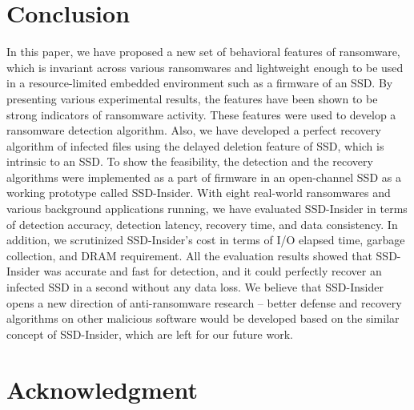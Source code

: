 \documentclass[conference]{IEEEtran}
\newcommand{\ours}{SSD-Insider}
\begin{document}
\section{Conclusion}
In this paper, we have proposed a new set of behavioral features of
ransomware, which is invariant across various ransomwares and
lightweight enough to be used in a resource-limited embedded
environment such as a firmware of an SSD.  By presenting various
experimental results, the features have been shown to be strong
indicators of ransomware activity.  These features were used to
develop a ransomware detection algorithm.  Also, we have developed
a perfect recovery algorithm of infected files using the delayed
deletion feature of SSD, which is intrinsic to an SSD.  To show the
feasibility, the detection and the recovery algorithms were
implemented as a part of firmware in an open-channel SSD as a
working prototype called \ours{}.  With eight real-world
ransomwares and various background applications running, we have
evaluated \ours{} in terms of detection accuracy, detection
latency, recovery time, and data consistency. In addition, we
scrutinized \ours{}'s cost in terms of I/O elapsed time, garbage
collection, and DRAM requirement. All the evaluation results showed
that \ours{} was accurate and fast for detection, and it could
perfectly recover an infected SSD in a second without any data
loss.  We believe that \ours{} opens a new direction of
anti-ransomware research -- better defense and recovery algorithms
on other malicious software would be developed based on the similar
concept of SSD-Insider, which are left for our future work.



\section*{Acknowledgment}





%
%
%

%
%


 


\end{document}
